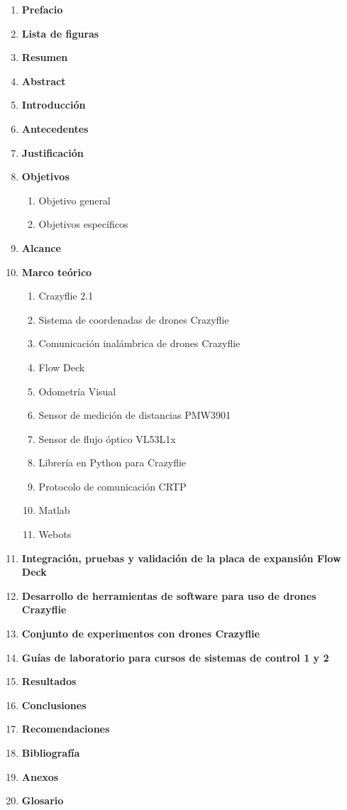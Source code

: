 \begin{enumerate}
	\item \textbf{Prefacio}
	\item \textbf{Lista de figuras}
	\item \textbf{Resumen}
	\item \textbf{Abstract}
	\item \textbf{Introducción}
	\item \textbf{Antecedentes}
	\item \textbf{Justificación}
	\item \textbf{Objetivos}
	\begin{enumerate}
		\item Objetivo general
		\item Objetivos específicos
	\end{enumerate}
	\item \textbf{Alcance}
	\item \textbf{Marco teórico}
	\begin{enumerate}
		\item Crazyflie 2.1
		\item Sistema de coordenadas de drones Crazyflie
		\item Comunicación inalámbrica de drones Crazyflie
		\item Flow Deck
		\item Odometría Visual
		\item Sensor de medición de distancias PMW3901 
		\item Sensor de flujo óptico VL53L1x
		\item Librería en Python para Crazyflie
		\item Protocolo de comunicación CRTP
		\item Matlab
		\item Webots
	\end{enumerate}
	\item \textbf{Integración, pruebas y validación de la placa de expansión Flow Deck}
	\item \textbf{Desarrollo de herramientas de software para uso de drones Crazyflie}
	\item \textbf{Conjunto de experimentos con drones Crazyflie}
	\item \textbf{Guías de laboratorio para cursos de sistemas de control 1 y 2}
	\item \textbf{Resultados}
	\item \textbf{Conclusiones}
	\item \textbf{Recomendaciones}
	\item \textbf{Bibliografía}
	\item \textbf{Anexos}
	\item \textbf{Glosario}
\end{enumerate}